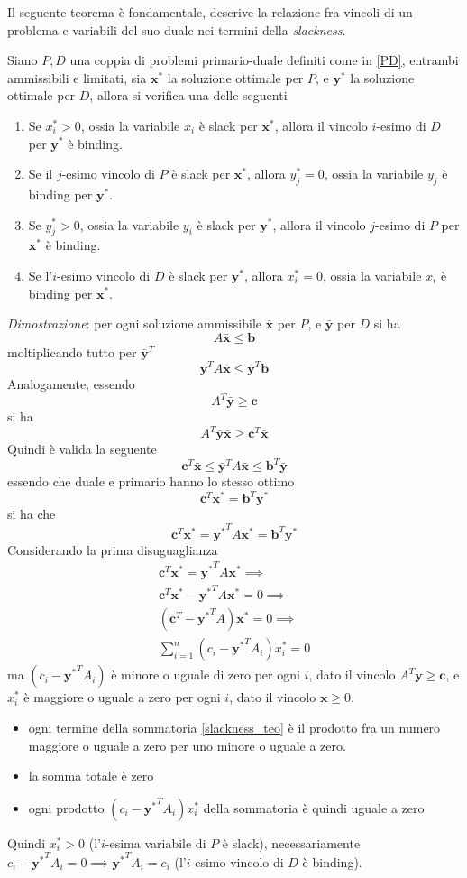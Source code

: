 \documentclass[10pt, letterpaper]{report}
\newcommand{\bb}{{\mathbf{b}}}
\newcommand{\bc}{{\mathbf{c}}}
\newcommand{\x}{{\mathbf{x}}}
\newcommand{\y}{{\mathbf{y}}}
\begin{document}
Il seguente teorema è fondamentale, descrive la relazione fra vincoli di un problema e variabili del suo duale nei termini della \textit{slackness}.
\begin{teorema}\label{complementary_slackness}
    Siano $P,D$ una coppia di problemi primario-duale definiti come in \ref{PD}, entrambi ammissibili e limitati, sia $\x^*$ la soluzione ottimale per $P$, e $\y^*$ la soluzione ottimale per $D$, allora si verifica una delle seguenti\begin{enumerate}
        \item Se $x^*_i>0$, ossia la variabile $x_i$ è slack per $\x^*$, allora il vincolo $i$-esimo di $D$ per $\y^*$ è binding.
        \item Se il $j$-esimo vincolo di $P$ è slack per $\x^*$, allora $y^*_j=0$, ossia
        la variabile $y_j$ è binding per $\y^*$.
        \item Se $y^*_j>0$, ossia la variabile $y_i$ è slack per $\y^*$, allora il vincolo $j$-esimo di $P$ per $\x^*$ è binding.
        \item Se l'$i$-esimo vincolo di $D$ è slack per $\y^*$, allora $x^*_i=0$, ossia
        la variabile $x_i$ è binding per $\x^*$.
    \end{enumerate}
\end{teorema}
\textit{Dimostrazione}: per ogni soluzione ammissibile $\bar\x$ per $P$, e $\bar\y$ per $D$ si ha 
$$ A\bar\x\le \bb$$
moltiplicando tutto per $\bar\y^T$
$$ \bar\y^TA\bar\x\le \bar\y^T\bb$$
Analogamente, essendo 
$$ A^T\bar\y\ge \bc$$
si ha 
$$ A^T\bar\y\bar\x\ge \bc^T\bar\x$$
Quindi è valida la seguente\begin{equation}
    \bc^T\bar\x\le\bar\y^TA\bar\x\le\bb^T\bar\y
\end{equation}
essendo che duale e primario hanno lo stesso ottimo 
$$ \bc^T\x^*=\bb^T\y^*$$
si ha che 
\begin{equation}
     \bc^T\x^*={\y^*}^TA\x^*=\bb^T\y^*
\end{equation}
Considerando la prima disuguaglianza \begin{eqnarray}
     \bc^T\x^*={\y^*}^TA\x^*\implies \\
      \bc^T\x^*-{\y^*}^TA\x^*=0\implies \\
      (\bc^T-{\y^*}^TA)\x^*=0 \implies \\ \label{slackness_teo}
      \sum_{i=1}^n(c_i-{\y^*}^TA_i)x^*_i=0
\end{eqnarray}
ma $(c_i-{\y^*}^TA_i)$ è minore o uguale di zero per ogni $i$, dato il vincolo $A^T\y\ge\bc$, e $x_i^*$ è maggiore o uguale a zero per ogni $i$, dato il vincolo $\x\ge 0$.\begin{itemize}
    \item ogni termine della sommatoria \ref{slackness_teo} è il prodotto fra un numero maggiore o uguale a zero per uno minore o uguale a zero.
    \item la somma totale è zero 
    \item ogni prodotto $(c_i-{\y^*}^TA_i)x^*_i$ della sommatoria è quindi uguale a zero
\end{itemize}
Quindi $x_i^*>0$ (l'$i$-esima variabile di $P$ è slack), necessariamente $c_i-{\y^*}^TA_i=0\implies {\y^*}^TA_i=c_i$ (l'$i$-esimo vincolo di $D$ è binding). 
\end{document}
